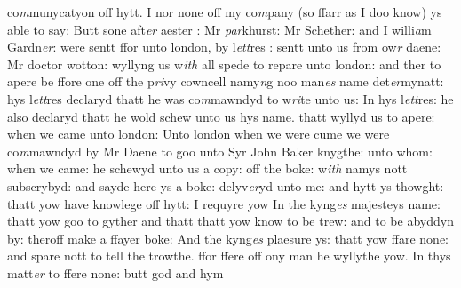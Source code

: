 \documentclass[12pt, a4paper]{book}
\begin{document}
		\ifthenelse{\isodd{\thepage}}
		{\reversemarginpar}
		{\normalmarginpar}
		co\textit{m}munycatyon off hytt. I nor none off my co\textit{m}pany (so ffarr as I doo know)  ys able to say: Butt sone aft\textit{er} aester : Mr \textit{par}khurst: Mr Schether: and I willi\textit{a}m Gardn\textit{er}: were sentt ffor unto london, by l\textit{ett}res : sentt unto us from ow\textit{r} daene: Mr doctor wotton: wyllyng us w\textit{ith} all spede to repare unto london: and ther to apere be ffore one off the p\textit{ri}vy cowncell namy\textit{n}g noo man\textit{es} name det\textit{er}mynatt: hys l\textit{ett}res declaryd thatt he was co\textit{m}mawndyd to w\textit{ri}te unto us: In hys l\textit{ett}res: he also declaryd thatt he wold schew unto us hys name. thatt wyllyd us to apere: when we came unto london: Unto london when we were cume we were co\textit{m}mawndyd by Mr Daene to goo unto Syr John Baker knygthe: unto whom: when we came: he schewyd unto us a copy: off the boke: w\textit{ith} namys nott subscrybyd: and sayde here ys a boke: delyv\textit{er}yd unto me: and hytt ys thowght: thatt yow have knowlege off hytt: I requyre yow In the kyng\textit{es} majesteys name: thatt yow goo to gyther and thatt thatt yow know to be trew: and to be abyddyn by: theroff make a ffayer boke: And the kyng\textit{es} plaesure ys: thatt yow ffare none: and spare nott to tell the trowthe. ffor ffere off ony man he wyllythe yow. In thys matt\textit{er} to ffere none: butt god and hym
            		
            			
			
\end{document}
